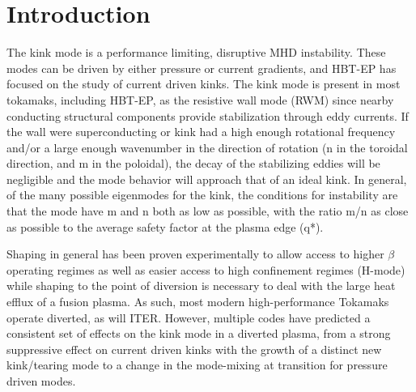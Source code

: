 \documentclass[aps,prl,twocolumn,superscriptaddress,groupedaddress]{revtex4}  %
\begin{document}
\section{Introduction}
The kink mode is a performance limiting, disruptive MHD instability\cite{Strait}.  These modes can be driven by either pressure or current gradients, and HBT-EP has focused on the study of current driven kinks.  The kink mode is present in most tokamaks, including HBT-EP, as the resistive wall mode (RWM) since nearby conducting structural components provide stabilization through eddy currents.  If the wall were superconducting or kink had a high enough rotational frequency and/or a large enough wavenumber in the direction of rotation (n in the toroidal direction, and m in the poloidal), the decay of the stabilizing eddies will be negligible and the mode behavior will approach that of an ideal kink.  In general, of the many possible eigenmodes for the kink, the conditions for instability are that the mode have m and n both as low as possible, with the ratio m/n as close as possible to the average safety factor at the plasma edge (q*).\par
	Shaping in general has been proven experimentally to allow access to higher $\beta$ operating regimes as well as easier access to high confinement regimes (H-mode)\citep{Lazarus, Keilhacker_HMode} while shaping to the point of diversion is necessary to deal with the large heat efflux of a fusion plasma. As such, most modern high-performance Tokamaks operate diverted, as will ITER.  However, multiple codes have predicted a consistent set of effects on the kink mode in a diverted plasma, from a strong suppressive effect on current driven kinks with the growth of a distinct new kink/tearing mode\cite{Huysmans} to a change in the mode-mixing at transition for pressure driven modes\cite{Maurer}.\par
\end{document}

